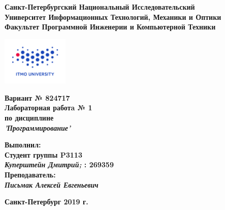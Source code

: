 \documentclass[11pt]{article}
\author{АВТОР}
\date{\today}
\title{}
\begin{document}
\large
\thispagestyle{empty}
\begin{center}
\textbf{Санкт-Петербургский Национальный Исследовательский}\\
\textbf{Университет Информационных Технологий, Механики и Оптики}\\
\textbf{Факультет Программной Инженерии и Компьютерной Техники}\\
\end{center}
\vspace{1em}
\begin{center}
\includegraphics[width=120px]{../../../itmo-logo.png}
\end{center}
\LARGE
\vspace{5em}
\begin{center}
\textbf{Вариант № 824717}\\
\textbf{Лабораторная работa № 1}\\
\Large
\textbf{по дисциплине}\\
\LARGE
\textbf{\emph{'Программирование'}}\\
\end{center}
\vspace{11em}
\large
\begin{flushright}
\textbf{Выполнил:}\\
\textbf{Студент группы P3113}\\
\textbf{\emph{Куперштейн Дмитрий;} : 269359}\\
\textbf{Преподаватель:}\\
\textbf{\emph{Письмак Алексей Евгеньевич}}\\
\end{flushright}
\vspace{4em}
\large
\begin{center}
\textbf{Санкт-Петербург 2019 г.}
\end{center}
\pagebreak{}
\setcounter{tocdepth}{2}
\renewcommand{\contentsname}{Оглавление}
\tableofcontents
\vspace{2em}
\pagebreak{}
\end{document}
